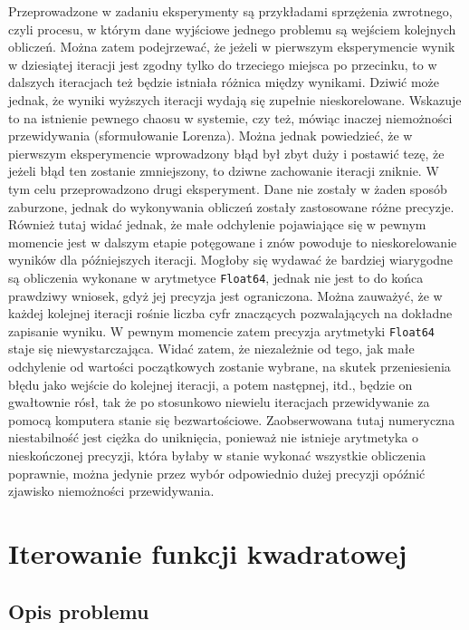 \documentclass[11pt]{mk-polish-lab-report}
\begin{document}
Przeprowadzone w zadaniu eksperymenty są przykładami sprzężenia zwrotnego, czyli procesu, w którym dane wyjściowe jednego problemu są wejściem kolejnych obliczeń. Można zatem podejrzewać, że jeżeli w pierwszym eksperymencie wynik w dziesiątej iteracji jest zgodny tylko do trzeciego miejsca po przecinku, to w dalszych iteracjach też będzie istniała różnica między wynikami. Dziwić może jednak, że wyniki wyższych iteracji wydają się zupełnie nieskorelowane. Wskazuje to na istnienie pewnego chaosu w systemie, czy też, mówiąc inaczej niemożności przewidywania (sformułowanie Lorenza). Można jednak powiedzieć, że w pierwszym eksperymencie wprowadzony błąd był zbyt duży i postawić tezę, że jeżeli błąd ten zostanie zmniejszony, to dziwne zachowanie iteracji zniknie. W tym celu przeprowadzono drugi eksperyment. Dane nie zostały w żaden sposób zaburzone, jednak do wykonywania obliczeń zostały zastosowane różne precyzje. Również tutaj widać jednak, że małe odchylenie pojawiające się w pewnym momencie jest w dalszym etapie potęgowane i znów powoduje to nieskorelowanie wyników dla późniejszych iteracji. Mogłoby się wydawać że bardziej wiarygodne są obliczenia wykonane w arytmetyce \texttt{Float64}, jednak nie jest to do końca prawdziwy wniosek, gdyż jej precyzja jest ograniczona. Można zauważyć, że w każdej kolejnej iteracji rośnie liczba cyfr znaczących pozwalających na dokładne zapisanie wyniku. W pewnym momencie zatem precyzja arytmetyki \texttt{Float64} staje się niewystarczająca. Widać zatem, że niezależnie od tego, jak małe odchylenie od wartości początkowych zostanie wybrane, na skutek przeniesienia błędu jako wejście do kolejnej iteracji, a potem następnej, itd., będzie on gwałtownie rósł, tak że po stosunkowo niewielu iteracjach przewidywanie za pomocą komputera stanie się bezwartościowe. Zaobserwowana tutaj numeryczna niestabilność jest ciężka do uniknięcia, ponieważ nie istnieje arytmetyka o nieskończonej precyzji, która byłaby w stanie wykonać wszystkie obliczenia poprawnie, można jedynie przez wybór odpowiednio dużej precyzji opóźnić zjawisko niemożności przewidywania.

\section{Iterowanie funkcji kwadratowej}

\subsection{Opis problemu}
\end{document}
